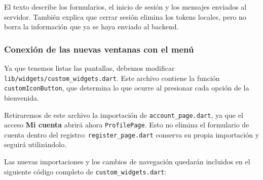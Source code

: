 El texto describe los formularios, el inicio de sesión y los mensajes enviados al servidor. También explica que cerrar sesión elimina los tokens locales, pero no borra la información que ya se haya enviado al backend.

\subsubsection{Conexión de las nuevas ventanas con el menú}
Ya que tenemos listas las pantallas, debemos modificar \texttt{lib/widgets/custom\_widgets.dart}. Este archivo contiene la función \texttt{customIconButton}, que determina lo que ocurre al presionar cada opción de la bienvenida.

Retiraremos de este archivo la importación de \texttt{account\_page.dart}, ya que el acceso \textbf{Mi cuenta} abrirá ahora \texttt{ProfilePage}. Esto no elimina el formulario de cuenta dentro del registro: \texttt{register\_page.dart} conserva su propia importación y seguirá utilizándolo.

Las nuevas importaciones y los cambios de navegación quedarán incluidos en el siguiente código completo de \texttt{custom\_widgets.dart}:

